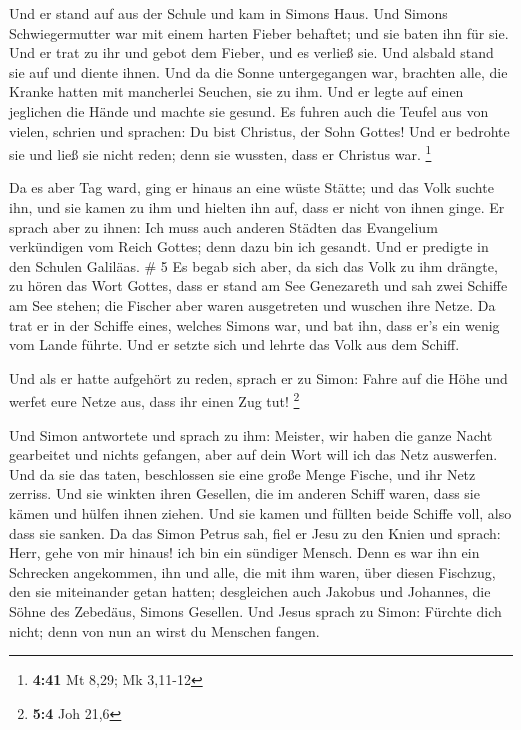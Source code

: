  Und er stand auf aus der Schule und kam in Simons Haus.
Und Simons Schwiegermutter war mit einem harten Fieber behaftet; und sie
baten ihn für sie.  Und er trat zu ihr und gebot dem
Fieber, und es verließ sie. Und alsbald stand sie auf und diente ihnen.
 Und da die Sonne untergegangen war, brachten alle, die
Kranke hatten mit mancherlei Seuchen, sie zu ihm. Und er legte auf einen
jeglichen die Hände und machte sie gesund.  Es fuhren auch
die Teufel aus von vielen, schrien und sprachen: Du bist Christus, der
Sohn Gottes! Und er bedrohte sie und ließ sie nicht reden; denn sie
wussten, dass er Christus war. \footnote{\textbf{4:41} Mt 8,29; Mk
  3,11-12}

 Da es aber Tag ward, ging er hinaus an eine wüste Stätte;
und das Volk suchte ihn, und sie kamen zu ihm und hielten ihn auf, dass
er nicht von ihnen ginge.  Er sprach aber zu ihnen: Ich
muss auch anderen Städten das Evangelium verkündigen vom Reich Gottes;
denn dazu bin ich gesandt.  Und er predigte in den Schulen
Galiläas. \# 5  Es begab sich aber, da sich das Volk zu ihm
drängte, zu hören das Wort Gottes, dass er stand am See Genezareth
 und sah zwei Schiffe am See stehen; die Fischer aber waren
ausgetreten und wuschen ihre Netze.  Da trat er in der
Schiffe eines, welches Simons war, und bat ihn, dass er's ein wenig vom
Lande führte. Und er setzte sich und lehrte das Volk aus dem Schiff.

 Und als er hatte aufgehört zu reden, sprach er zu Simon:
Fahre auf die Höhe und werfet eure Netze aus, dass ihr einen Zug tut!
\footnote{\textbf{5:4} Joh 21,6}

 Und Simon antwortete und sprach zu ihm: Meister, wir haben
die ganze Nacht gearbeitet und nichts gefangen, aber auf dein Wort will
ich das Netz auswerfen.  Und da sie das taten, beschlossen
sie eine große Menge Fische, und ihr Netz zerriss.  Und sie
winkten ihren Gesellen, die im anderen Schiff waren, dass sie kämen und
hülfen ihnen ziehen. Und sie kamen und füllten beide Schiffe voll, also
dass sie sanken.  Da das Simon Petrus sah, fiel er Jesu zu
den Knien und sprach: Herr, gehe von mir hinaus! ich bin ein sündiger
Mensch.  Denn es war ihn ein Schrecken angekommen, ihn und
alle, die mit ihm waren, über diesen Fischzug, den sie miteinander getan
hatten;  desgleichen auch Jakobus und Johannes, die Söhne
des Zebedäus, Simons Gesellen. Und Jesus sprach zu Simon: Fürchte dich
nicht; denn von nun an wirst du Menschen fangen.

